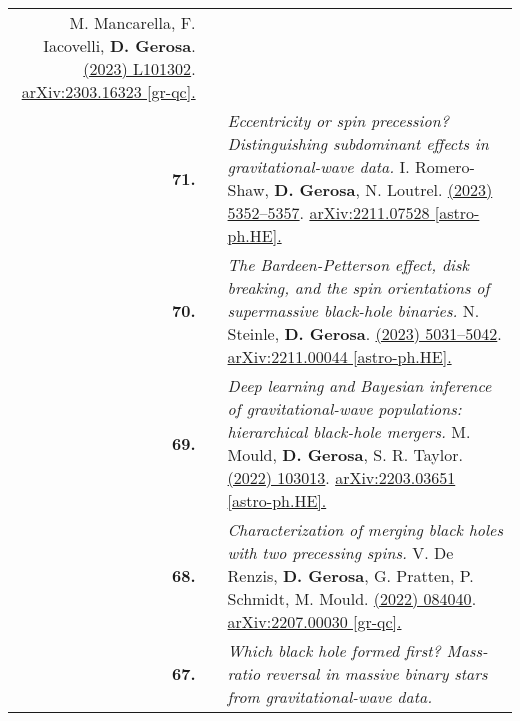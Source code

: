 {\begin{longtable}{rp{0.3cm}p{15.8cm}}
\newline{}
M. Mancarella, F. Iacovelli, \textbf{D. Gerosa}.
\newline{}
\href{https://journals.aps.org/prd/abstract/10.1103/PhysRevD.107.L101302}{\prdl 107 (2023) L101302}. \href{https://arxiv.org/abs/2303.16323}{arXiv:2303.16323 [gr-qc].}
\vspace{0.09cm}\\
%
\textbf{71.} & & \textit{Eccentricity or spin precession? Distinguishing subdominant effects in gravitational-wave data.}
\newline{}
I. Romero-Shaw, \textbf{D. Gerosa}, N. Loutrel.
\newline{}
\href{https://doi.org/10.1093/mnras/stad031}{\mnras 519 (2023) 5352–5357}. \href{https://arxiv.org/abs/2211.07528}{arXiv:2211.07528 [astro-ph.HE].}
\vspace{0.09cm}\\
%
\textbf{70.} & & \textit{The Bardeen-Petterson effect, disk breaking, and the spin orientations of supermassive black-hole binaries.}
\newline{}
N. Steinle, \textbf{D. Gerosa}.
\newline{}
\href{https://doi.org/10.1093/mnras/stac3821}{\mnras 519 (2023) 5031–5042}. \href{https://arxiv.org/abs/2211.00044}{arXiv:2211.00044 [astro-ph.HE].}
\vspace{0.09cm}\\
%
\textbf{69.} & & \textit{Deep learning and Bayesian inference of gravitational-wave populations: hierarchical black-hole mergers.}
\newline{}
M. Mould, \textbf{D. Gerosa}, S. R. Taylor.
\newline{}
\href{https://journals.aps.org/prd/abstract/10.1103/PhysRevD.106.103013}{\prd 106 (2022) 103013}. \href{https://arxiv.org/abs/2203.03651}{arXiv:2203.03651 [astro-ph.HE].}
\vspace{0.09cm}\\
%
\textbf{68.} & & \textit{Characterization of merging black holes with two precessing spins.}
\newline{}
V. De Renzis, \textbf{D. Gerosa}, G. Pratten, P. Schmidt, M. Mould.
\newline{}
\href{https://journals.aps.org/prd/abstract/10.1103/PhysRevD.106.084040}{\prd 106 (2022) 084040}. \href{https://arxiv.org/abs/2207.00030}{arXiv:2207.00030 [gr-qc].}
\vspace{0.09cm}\\
%
\textbf{67.} & & \textit{Which black hole formed first? Mass-ratio reversal in massive binary stars from gravitational-wave data.}

\end{longtable}}
